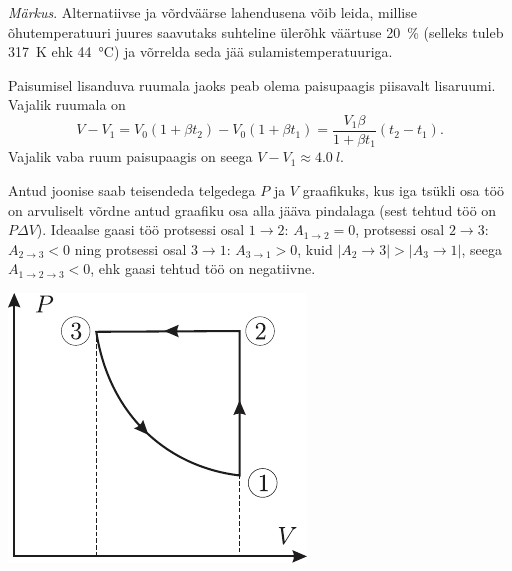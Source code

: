 \documentclass[10pt]{article}
\begin{document}
{\emph{Märkus}. Alternatiivse ja võrdväärse lahendusena võib leida, millise õhutemperatuuri juures saavutaks suhteline ülerõhk väärtuse \SI{20}{\%} (selleks tuleb \SI{317}{K} ehk \SI{44}{\degreeCelsius}) ja võrrelda seda jää sulamistemperatuuriga.
\probend
\bigskip


\solu
Paisumisel lisanduva ruumala jaoks peab olema paisupaagis piisavalt lisaruumi. Vajalik ruumala on
\[
V-V_{1}=V_{0}\left(1+\beta t_{2}\right)-V_{0}\left(1+\beta t_{1}\right)=\frac{V_{1} \beta}{1+\beta t_{1}}\left(t_{2}-t_{1}\right).
\]
Vajalik vaba ruum paisupaagis on seega $V - V_1 \approx \SI{4,0}{l}$.
\probend
\bigskip


\solu
Antud joonise saab teisendeda telgedega $P$ ja $V$ graafikuks, kus iga tsükli osa töö on arvuliselt võrdne antud graafiku osa alla jääva pindalaga (sest tehtud töö on $P\Delta V$). Ideaalse gaasi töö protsessi osal $1 \rightarrow 2$: $A_{1\rightarrow 2} = 0$, protsessi osal $2 \rightarrow 3$: $A_{2\rightarrow 3} < 0$ ning protsessi osal $3 \rightarrow 1$: $A_{3\rightarrow 1} > 0$, kuid $|A_2\rightarrow 3| > |A_3\rightarrow 1|$, seega $A_{1\rightarrow 2\rightarrow 3} < 0$, ehk gaasi tehtud töö on negatiivne.

\begin{center}
	\includegraphics[width=0.4\linewidth]{2006-v2g-02-lah}
\end{center}
\probend
\bigskip


}
\end{document}
